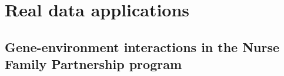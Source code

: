 \documentclass[a4paper,fleqn]{cas-sc}
\newcommand{\sail}{\texttt{sail}}
\begin{document}


%
%
%


\section{Real data applications} \label{sec:sail_rda}

\subsection{Gene-environment interactions in the Nurse Family Partnership program}




\end{document}
